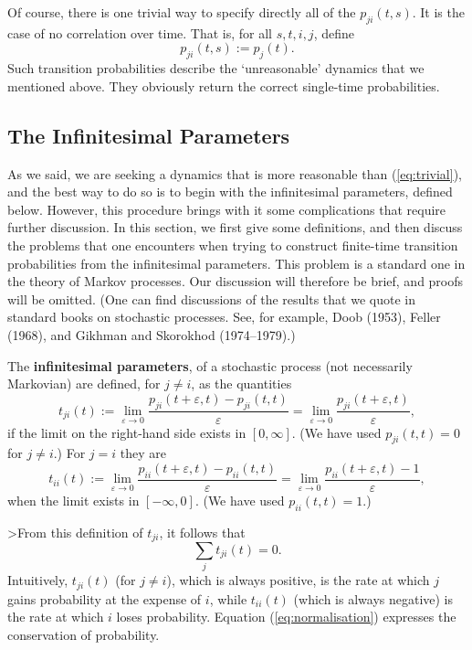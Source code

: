 \documentclass[12pt]{article}
\newcommand{\be}{\begin{equation}}
\newcommand{\ee}{\end{equation}}
\renewcommand{\epsilon}{\varepsilon}
\begin{document}
Of course, there is one trivial way to specify directly all of the
$p_{ji}(t,s)$.  It is the case of no correlation over time.  That is,
for all $s,t,i,j$, define
\be
\label{eq:trivial}
p_{ji}(t,s) := p_{j}(t).
\ee
Such transition probabilities describe the `unreasonable' dynamics
that we mentioned above.  They obviously return the correct
single-time probabilities.


\subsection{The Infinitesimal Parameters}


As we said, we are seeking a dynamics that is more reasonable than
(\ref{eq:trivial}), and the best way to do so is to begin with the
infinitesimal parameters, defined below.  However, this procedure
brings with it some complications that require further discussion.  In
this section, we first give some definitions, and then discuss the
problems that one encounters when trying to construct finite-time
transition probabilities from the infinitesimal parameters.  This
problem is a standard one in the theory of Markov processes.  Our
discussion will therefore be brief, and proofs will be omitted.  (One
can find discussions of the results that we quote in standard books on
stochastic processes.  See, for example, Doob (1953), Feller (1968), 
and Gikhman and Skorokhod (1974--1979).)

The {\bf infinitesimal parameters}, of a stochastic process (not
necessarily Markovian) are defined, for $j\neq i$, as the quantities
\be
\label{eq:inf1}
t_{ji}(t):=\lim_{\epsilon\rightarrow 0}
\frac{p_{ji}(t+\epsilon,t) - p_{ji}(t,t)}{\epsilon} =
\lim_{\epsilon\rightarrow 0}
\frac{p_{ji}(t+\epsilon,t)}{\epsilon},
\ee
if the limit on the right-hand side exists in $[0,\infty]$.  (We have
used $p_{ji}(t,t) = 0$ for $j \neq i$.) For $j=i$ they are
\be
\label{eq:inf2}
t_{ii}(t):= \lim_{\epsilon\rightarrow 0}\frac{p_{ii}(t+\epsilon,t) -
p_{ii}(t,t)}{\epsilon} = \lim_{\epsilon\rightarrow
0}\frac{p_{ii}(t+\epsilon,t)-1}{\epsilon},
\ee
when the limit exists in $[-\infty,0]$.  (We have used $p_{ii}(t,t) =
1$.)

>From this definition of $t_{ji}$, it follows that
\be
\sum_j t_{ji}(t)=0.
\label{eq:normalisation}
\ee
Intuitively, $t_{ji}(t)$ (for $j\neq i$), which is always positive, is
the rate at which $j$ gains probability at the expense of $i$, while
$t_{ii}(t)$ (which is always negative) is the rate at which $i$ loses
probability.  Equation (\ref{eq:normalisation}) expresses the
conservation of probability.
\end{document}
